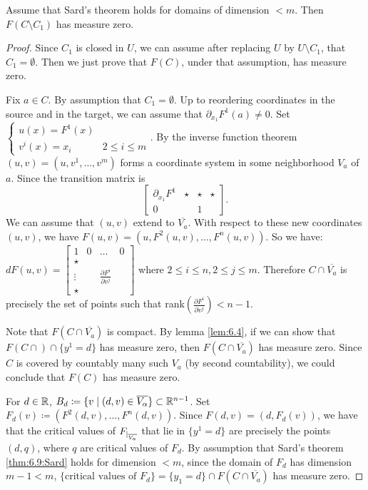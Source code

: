 \begin{lemma}\label{lem:6.15}
    Assume that Sard's theorem holds for domains of dimension \(<m\). Then \(F(C\setminus C_1)\) has measure zero.
\end{lemma}

\begin{proof}
    Since \(C_1\) is closed in \(U\), we can assume after replacing \(U\) by \(U\setminus C_1\), that \(C_1=\emptyset\).
    Then we just prove that \(F(C)\), under that assumption, has measure zero. 
    
    Fix \(a\in C\). By assumption that \(C_1=\emptyset\). Up to reordering coordinates in the source and in the target, we can assume 
    that \(\partial_{x_1}F^1(a)\neq 0\).
    Set \(\begin{cases}
        u(x)=F^1(x)&\\
        v^i(x)=x_i  & 2\leq i\leq m
    \end{cases}\). By the inverse function theorem \((u,v)=(u,v^1,\dots,v^m)\)
    forms a coordinate system in some neighborhood \(V_a\) of \(a\). Since the transition matrix is
    \[\begin{bmatrix}
        \partial_{x_1} F^1 & \star & \star &\star \\
        0 & & 1 &
    \end{bmatrix}.\]
    We can assume that \((u,v)\) extend to \(\overline{V_a}\). With respect to 
    these new coordinates \((u,v)\), we have \(F(u,v)=(u,F^2(u,v),\dots,F^n(u,v))\).
    So we have: \(dF(u,v)=\begin{bmatrix}
        1 & 0 &\dots & 0\\
        \star & &  \\
        \vdots && \frac{\partial F^i}{\partial v^j}&\\
        \star & &&
    \end{bmatrix}\) where \(2\leq i\leq n, 2\leq j\leq m\). 
    Therefore \(C\cap \overline{V_a}\) is precisely the set of points such that rank\(\left(\frac{\partial F^i}{\partial v^j}\right)<n-1\). 

    Note that \(F(C\cap \overline{V_a})\) is compact. By lemma \ref{lem:6.4}, if we can show that \(F(C\cap)\cap \{y^1=d\}\)
    has measure zero, then \(F(C\cap \overline{V_a})\) has measure zero. Since \(C\) is covered by countably many such \(V_a\) (by second countability),
    we could conclude that \(F(C)\) has measure zero.

    For \(d\in\mathbb{R}\), \(B_d\coloneqq \{v\mid (d,v)\in \overline{V_\alpha}\}\subset \mathbb{R}^{n-1}\). 
    Set \(F_d(v)\coloneqq (F^2(d,v),\dots,F^n(d,v))\). Since \(F(d,v)=(d,F_d(v))\), we 
    have that the critical values of \(F_{|_{\overline{V_a}}}\) that lie in \(\{y^1=d\}\)
    are precisely the points \((d,q)\), where \(q\) are critical values of \(F_d\). 
    By assumption that Sard's theorem \ref{thm:6.9:Sard} holds for dimension \(<m\), since the domain of \(F_d\)
    has dimension \(m-1<m\), \(\{\text{critical values of } F_d\}=\{y_1=d\}\cap F(C\cap \overline{V_a})\) has 
    measure zero. \qedhere

\end{proof}
